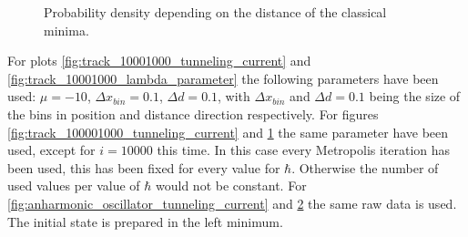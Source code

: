 \documentclass{scrartcl}
\begin{document}
\begin{figure}[H]
\begin{subfigure}[c]{0.49\textwidth}
					\label{fig:track_100001000_lambda_parameter}
				\end{subfigure}
			\caption{Probability density depending on the distance of the classical minima.}
			\label{fig:anharmonic_oscillator_lambda_parameter}
		\end{figure}
		For plots \ref{fig:track_10001000_tunneling_current} and \ref{fig:track_10001000_lambda_parameter} the following parameters have been used: $\mu = -10$, $\Delta x_{bin} = 0.1$, $\Delta d = 0.1$, with $\Delta x_{bin}$ and $\Delta d = 0.1$ being the size of the bins in position and distance direction respectively.
		For figures \ref{fig:track_100001000_tunneling_current} and \ref{fig:track_100001000_lambda_parameter} the same parameter have been used, except for $i = 10000$ this time.
		In this case every  Metropolis iteration has been used, this has been fixed for every value for $\hbar$.
		Otherwise the number of used values per value of $\hbar$ would not be constant.
		For \ref{fig:anharmonic_oscillator_tunneling_current} and \ref{fig:anharmonic_oscillator_lambda_parameter} the same raw data is used.
		The initial state is prepared in the left minimum.
\end{document}
